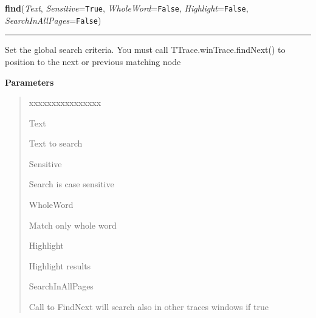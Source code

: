     \vspace{0.5ex}

\hspace{.8\funcindent}\begin{boxedminipage}{\funcwidth}

    \raggedright \textbf{find}(\textit{Text}, \textit{Sensitive}={\tt True}, \textit{WholeWord}={\tt False}, \textit{Highlight}={\tt False}, \textit{SearchInAllPages}={\tt False})

    \vspace{-1.5ex}

    \rule{\textwidth}{0.5\fboxrule}
\setlength{\parskip}{2ex}
    Set the global search criteria. You must call 
    TTrace.winTrace.findNext() to position to the next or previous matching
    node

\setlength{\parskip}{1ex}
      \textbf{Parameters}
      \vspace{-1ex}

      \begin{quote}
        \begin{Ventry}{xxxxxxxxxxxxxxxx}

          \item[Text]

          Text to search

          \item[Sensitive]

          Search is case sensitive

          \item[WholeWord]

          Match only whole word

          \item[Highlight]

          Highlight results

          \item[SearchInAllPages]

          Call to FindNext will search also in other traces windows if true

        \end{Ventry}

      \end{quote}

    \end{boxedminipage}

    \label{tracetool:TTrace:closeViewer}

